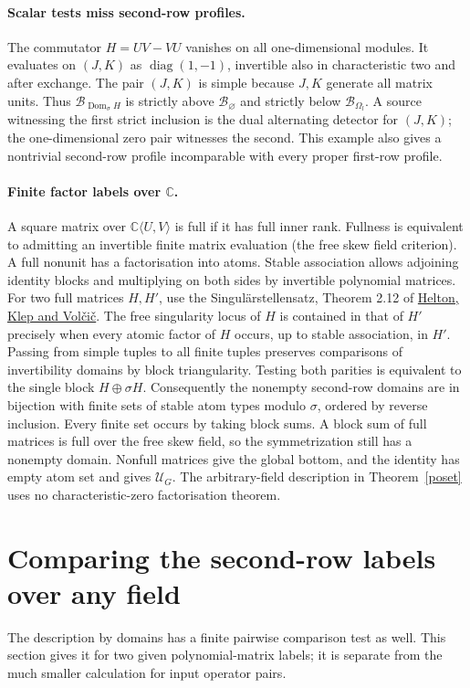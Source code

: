 \documentclass[11pt]{article}
\newcommand{\Dom}{\operatorname{Dom}_{\sigma}}
\newcommand{\prof}{\mathcal U}
\newcommand{\bb}{\mathcal B}
\begin{document}
\paragraph{Scalar tests miss second-row profiles.}
The commutator $H=UV-VU$ vanishes on all one-dimensional modules. It
evaluates on $(J,K)$ as $\operatorname{diag}(1,-1)$, invertible also in
characteristic two and after exchange. The pair $(J,K)$ is simple
because $J,K$ generate all matrix units. Thus $\bb_{\Dom H}$ is
strictly above $\bb_\varnothing$ and strictly below $\bb_{\Omega_l}$.
A source witnessing the first strict inclusion is the dual alternating
detector for $(J,K)$; the one-dimensional zero pair witnesses the second.
This example also gives a nontrivial second-row profile incomparable
with every proper first-row profile.

\paragraph{Finite factor labels over $\mathbb C$.}
A square matrix over $\mathbb C\langle U,V\rangle$ is full if it has
full inner rank. Fullness is equivalent to admitting an invertible
finite matrix evaluation (the free skew field criterion). A full
nonunit has a factorisation into atoms. Stable association allows
adjoining identity blocks and multiplying on both sides by invertible
polynomial matrices. For two full matrices $H,H'$, use the
Singul\"arstellensatz, Theorem 2.12 of
\href{https://arxiv.org/abs/1907.04328}{Helton, Klep and Vol\v ci\v c}.
The free singularity locus of $H$ is contained in that of $H'$ precisely
when every atomic factor of $H$ occurs, up to stable association, in $H'$.
Passing from simple tuples to all finite tuples preserves comparisons of
invertibility domains by block triangularity. Testing both parities is
equivalent to the single block $H\oplus\sigma H$. Consequently the
nonempty second-row domains are in bijection with finite sets of
stable atom types modulo $\sigma$, ordered by reverse inclusion.
Every finite set occurs by taking block sums. A block sum of full matrices
is full over the free skew field, so the symmetrization still has a
nonempty domain. Nonfull matrices give the global bottom, and the
identity has empty atom set and gives $\prof_G$.
The arbitrary-field description in Theorem~\ref{poset} uses no
characteristic-zero factorisation theorem.

\section{Comparing the second-row labels over any field}\label{effective}
The description by domains has a finite pairwise comparison test as well.
This section gives it for two given polynomial-matrix labels; it is
separate from the much smaller calculation for input operator pairs.
\end{document}
